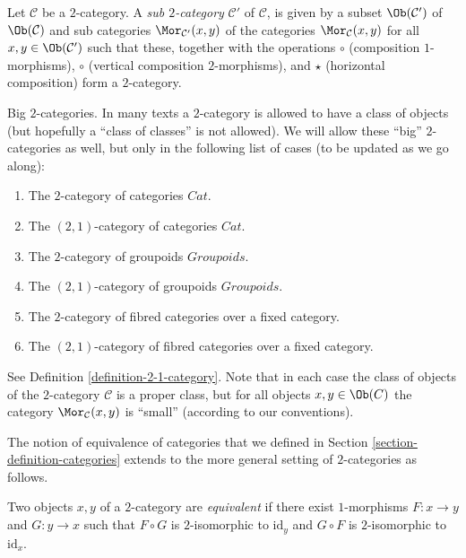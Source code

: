 \begin{definition}
\label{definition-sub-2-category}
Let $\mathcal{C}$ be a $2$-category.
A {\it sub $2$-category} $\mathcal{C}'$ of $\mathcal{C}$, is given by a subset
$\Ob(\mathcal{C}')$ of $\Ob(\mathcal{C})$
and sub categories $\Mor_{\mathcal{C}'}(x, y)$ of the
categories $\Mor_\mathcal{C}(x, y)$ for all
$x, y \in \Ob(\mathcal{C}')$ such that these, together with
the operations $\circ$ (composition $1$-morphisms), $\circ$ (vertical
composition $2$-morphisms), and $\star$ (horizontal composition)
form a $2$-category.
\end{definition}

\begin{remark}
\label{remark-big-2-categories}
Big $2$-categories.
In many texts a $2$-category is allowed to have a class of
objects (but hopefully a ``class of classes'' is not allowed).
We will allow these ``big'' $2$-categories as well, but only
in the following list of cases (to be updated as we go along):
\begin{enumerate}
\item The $2$-category of categories $\textit{Cat}$.
\item The $(2, 1)$-category of categories $\textit{Cat}$.
\item The $2$-category of groupoids $\textit{Groupoids}$.
\item The $(2, 1)$-category of groupoids $\textit{Groupoids}$.
\item The $2$-category of fibred categories over a fixed category.
\item The $(2, 1)$-category of fibred categories over a fixed category.
\end{enumerate}
See Definition \ref{definition-2-1-category}.
Note that in each case the class of objects of the $2$-category
$\mathcal{C}$ is a proper class, but for all objects $x, y \in \Ob(C)$
the category $\Mor_\mathcal{C}(x, y)$ is ``small'' (according to
our conventions).
\end{remark}

\noindent
The notion of equivalence of categories that we defined in Section
\ref{section-definition-categories} extends to the more general setting of
$2$-categories as follows.

\begin{definition}
\label{definition-equivalence}
Two objects $x, y$ of a $2$-category are {\it equivalent} if there exist
$1$-morphisms $F : x \to y$ and $G : y \to x$ such that $F \circ G$ is
$2$-isomorphic to $\text{id}_y$ and $G \circ F$ is $2$-isomorphic to
$\text{id}_x$.
\end{definition}

